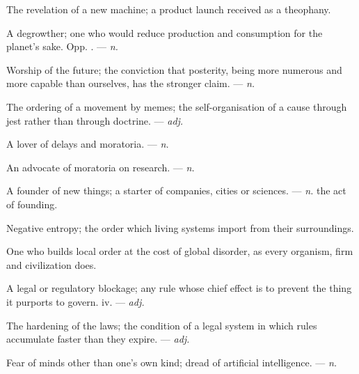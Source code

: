  The revelation of a new machine; a product launch received as a theophany.

 A degrowther; one who would reduce production and consumption for the planet's sake. Opp. . ---  \textit{n.}

 Worship of the future; the conviction that posterity, being more numerous and more capable than ourselves, has the stronger claim. ---  \textit{n.}

 The ordering of a movement by memes; the self-organisation of a cause through jest rather than through doctrine. ---  \textit{adj.}

 A lover of delays and moratoria. ---  \textit{n.}

 An advocate of moratoria on research. ---  \textit{n.}

 A founder of new things; a starter of companies, cities or sciences.  ---  \textit{n.} the act of founding.

 Negative entropy; the order which living systems import from their surroundings.

 One who builds local order at the cost of global disorder, as every organism, firm and civilization does.

 A legal or regulatory blockage; any rule whose chief effect is to prevent the thing it purports to govern.   iv. ---  \textit{adj.}

 The hardening of the laws; the condition of a legal system in which rules accumulate faster than they expire. ---  \textit{adj.}

 Fear of minds other than one's own kind; dread of artificial intelligence. ---  \textit{n.}

